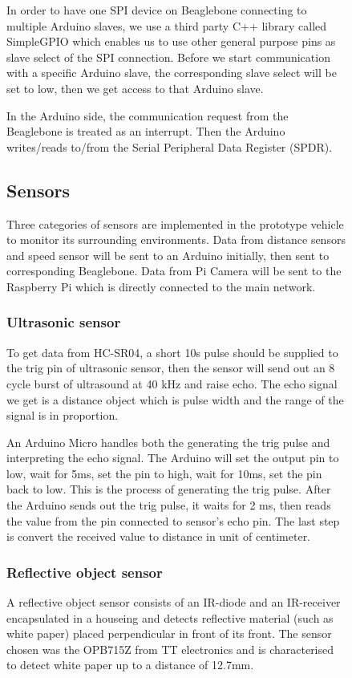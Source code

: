 \documentclass[11pt, titlepage]{article} %
\begin{document}
\begin{figure}
In order to have one SPI device on Beaglebone connecting to multiple Arduino slaves, we use a third party C++ library called SimpleGPIO which enables us to use other general purpose pins as slave select of the SPI connection. Before we start communication with a specific Arduino slave, the corresponding slave select will be set to low, then we get access to that Arduino slave.

In the Arduino side, the communication request from the Beaglebone is treated as an interrupt. Then the Arduino writes/reads to/from the Serial Peripheral Data Register (SPDR). 
\subsection{Sensors}
Three categories of sensors are implemented in the prototype vehicle to monitor its surrounding environments. Data from distance sensors and speed sensor will be sent to an Arduino initially, then sent to corresponding Beaglebone. Data from Pi Camera will be sent to the Raspberry Pi which is directly connected to the main network.
\subsubsection{Ultrasonic sensor}
To get data from HC-SR04, a short 10\textmu s pulse should be supplied to the trig pin of ultrasonic sensor, then the sensor will send out an 8 cycle burst of ultrasound at 40 kHz and raise echo. The echo signal we get is a distance object which is pulse width and the range of the signal is in proportion. 

An Arduino Micro handles both the generating the trig pulse and interpreting the echo signal. The Arduino will set the output pin to low, wait for 5ms, set the pin to high, wait for 10ms, set the pin back to low. This is the process of generating the trig pulse. After the Arduino sends out the trig pulse, it waits for 2 ms, then reads the value from the pin connected to sensor's echo pin. The last step is convert the received value to distance in unit of centimeter.


\subsubsection{Reflective object sensor}
A reflective object sensor consists of an IR-diode and an IR-receiver encapsulated in a houseing and detects reflective material (such as white paper) placed perpendicular in front of its front. The sensor chosen was the OPB715Z from TT electronics and is characterised to detect white paper up to a distance of 12.7mm.


\end{figure}
\end{document}
